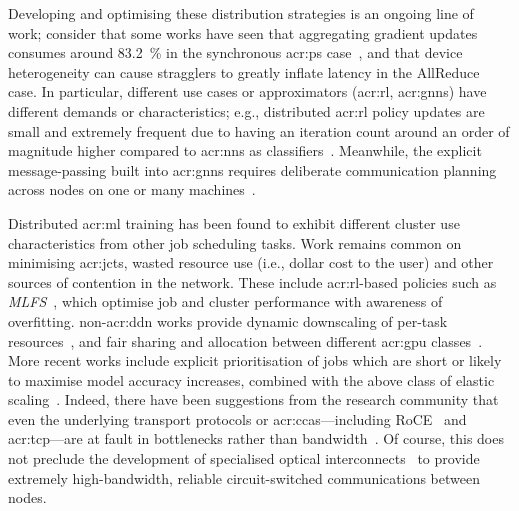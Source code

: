Developing and optimising these distribution strategies is an ongoing line of work; consider that some works have seen that aggregating gradient updates consumes around \qty{83.2}{\percent} in the synchronous \gls{acr:ps} case~\parencite{DBLP:conf/isca/LiLYCSH19}, and that device heterogeneity can cause stragglers to greatly inflate latency in the AllReduce case.
In particular, different use cases or approximators (\gls{acr:rl}, \glspl{acr:gnn}) have different demands or characteristics; e.g., distributed \gls{acr:rl} policy updates are small and extremely frequent due to having an iteration count around an order of magnitude higher compared to \glspl{acr:nn} as classifiers~\parencite{DBLP:conf/isca/LiLYCSH19}.
Meanwhile, the explicit message-passing built into \glspl{acr:gnn} requires deliberate communication planning across nodes on one or many machines~\parencite{DBLP:conf/eurosys/Cai0WMCY21,DBLP:conf/eurosys/WangY0YCYYZ21}.

Distributed \gls{acr:ml} training has been found to exhibit different cluster use characteristics from other job scheduling tasks.
Work remains common on minimising \glspl{acr:jct}, wasted resource use (i.e., dollar cost to the user) and other sources of contention in the network.
These include \gls{acr:rl}-based policies such as \emph{MLFS}~\parencite{DBLP:conf/conext/0002LS20}, which optimise job and cluster performance with awareness of overfitting.
non-\gls{acr:ddn} works provide dynamic downscaling of per-task resources~\parencite{DBLP:conf/eurosys/MisraLDBKGST21}, and fair sharing and allocation between different \gls{acr:gpu} classes~\parencite{DBLP:conf/eurosys/ChaudharyRSKV20}.
More recent works include explicit prioritisation of jobs which are short or likely to maximise model accuracy increases, combined with the above class of elastic scaling~\parencite{DBLP:conf/nsdi/HwangKKSP21}.
Indeed, there have been suggestions from the research community that even the underlying transport protocols or \glspl{acr:cca}---including RoCE~\parencite{rocev2} and \gls{acr:tcp}---are at fault in bottlenecks rather than bandwidth~\parencite{DBLP:conf/sigcomm/ZhangCLWAJ20}.
Of course, this does not preclude the development of specialised optical interconnects~\parencite{DBLP:conf/sigcomm/ShirkoohiGAZGBV21} to provide extremely high-bandwidth, reliable circuit-switched communications between nodes.

